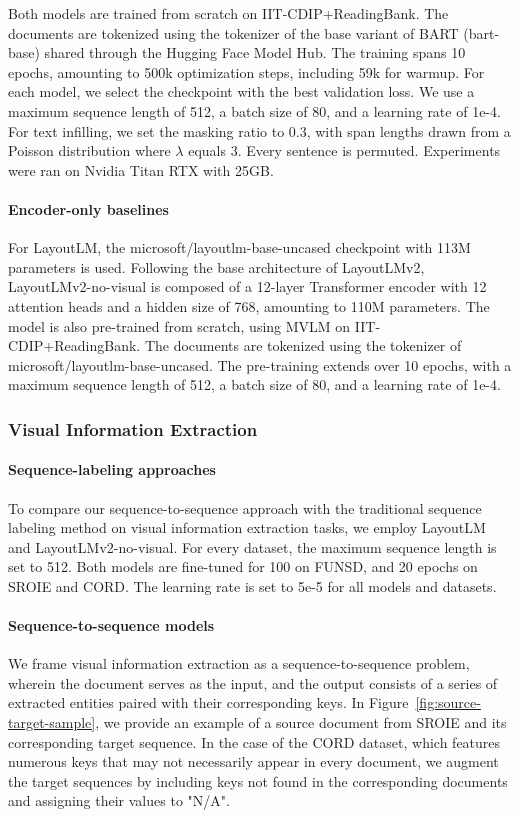 Both models are trained from scratch on IIT-CDIP+ReadingBank. The documents are tokenized 
using the tokenizer of the base variant of \ac{BART} (bart-base) shared through the Hugging Face Model Hub. The training spans 10 epochs, amounting to 500k optimization steps, including 59k for warmup. For each model, we select the checkpoint with the best validation loss. We use a maximum sequence length of 512, a batch size of 80, and a learning rate of 1e-4. For text infilling, we set the masking ratio to 0.3, with span lengths drawn from a Poisson distribution where $\lambda$ equals 3. Every sentence is permuted. Experiments were ran on Nvidia Titan RTX with 25GB. 

\paragraph{Encoder-only baselines} For LayoutLM, the microsoft/layoutlm-base-uncased checkpoint with 113M parameters is used. Following the base architecture of LayoutLMv2, LayoutLMv2-no-visual is composed of a 12-layer Transformer encoder with 12 attention heads and a hidden size of 768, amounting to 110M parameters. The model is also pre-trained from scratch, using \ac{MVLM} on IIT-CDIP+ReadingBank. The documents are tokenized using the tokenizer of microsoft/layoutlm-base-uncased. The pre-training extends over 10 epochs, with a maximum sequence length of 512, a batch size of 80, and a learning rate of 1e-4.


\subsubsection{Visual Information Extraction}

\paragraph{Sequence-labeling approaches}

To compare our sequence-to-sequence approach with the traditional sequence labeling method on visual information extraction tasks, we employ LayoutLM and LayoutLMv2-no-visual. For every dataset, the maximum sequence length is set to 512. Both models are fine-tuned for 100 on FUNSD, and 20 epochs on SROIE and CORD. The learning rate is set to 5e-5 for all models and datasets.

\paragraph{Sequence-to-sequence models} We frame visual information extraction as a sequence-to-sequence problem, wherein the document serves as the input, and the output consists of a series of extracted entities paired with their corresponding keys. In Figure~\ref{fig:source-target-sample}, we provide an example of a source document from SROIE and its corresponding target sequence. In the case of the CORD dataset, which features numerous keys that may not necessarily appear in every document, we augment the target sequences by including keys not found in the corresponding documents and assigning their values to "N/A". 

